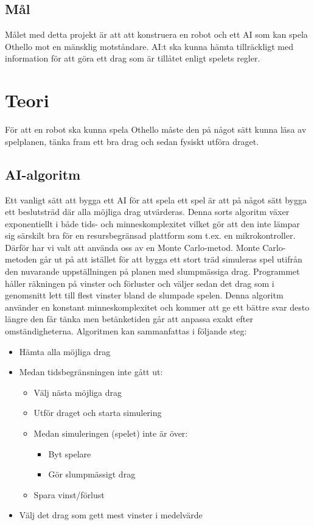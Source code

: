 \documentclass[a4paper]{article}
\begin{document}
\subsection{Mål}
Målet med detta projekt är att att konstruera en robot och ett AI som kan spela Othello mot en mänsklig motståndare.
AI:t ska kunna hämta tillräckligt med information för att göra ett drag som är tillåtet enligt spelets regler.

\section{Teori}
För att en robot ska kunna spela Othello måste den på något sätt kunna läsa av spelplanen, tänka fram ett bra drag och sedan fysiskt utföra draget.

\subsection{AI-algoritm} \label{AI}
Ett vanligt sätt att bygga ett AI för att spela ett spel är att på något sätt bygga ett beslutsträd där alla möjliga drag utvärderas.
Denna sorts algoritm växer exponentiellt i både tids- och minneskomplexitet vilket gör att den inte lämpar sig särskilt bra för en resursbegränsad plattform som t.ex. en mikrokontroller.
Därför har vi valt att använda oss av en Monte Carlo-metod.
Monte Carlo-metoden går ut på att istället för att bygga ett stort träd simuleras spel utifrån den nuvarande uppställningen på planen med slumpmässiga drag.
Programmet håller räkningen på vinster och förluster och väljer sedan det drag som i genomsnitt lett till flest vinster bland de slumpade spelen.
Denna algoritm använder en konstant minneskomplexitet och kommer att ge ett bättre svar desto längre den får tänka men betänketiden går att anpassa exakt efter omständigheterna.
Algoritmen kan sammanfattas i följande steg:
\begin{itemize}
\item Hämta alla möjliga drag
\item Medan tidsbegränsningen inte gått ut: 
	\begin{itemize} 
	\item Välj nästa möjliga drag
	\item Utför draget och starta simulering
	\item Medan simuleringen (spelet) inte är över:
		\begin{itemize}
		\item Byt spelare
		\item Gör slumpmässigt drag
		\end{itemize}	
	\item Spara vinst/förlust
	\end{itemize}
\item Välj det drag som gett mest vinster i medelvärde
\end{itemize}
\end{document}
